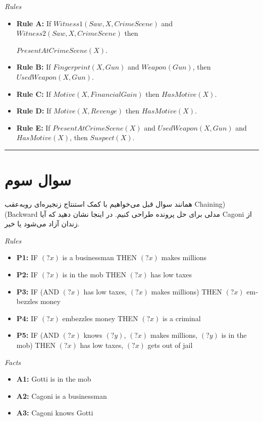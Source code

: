 \documentclass[a4paper,10pt]{article}
\begin{document}
\begin{latin}
	\emph{Rules}
\begin{itemize}
	\item \textbf{Rule A:} If $Witness1(Saw, X, CrimeScene)$ and $Witness2(Saw, X, CrimeScene)$ then
	 
	 $PresentAtCrimeScene(X)$.
	\item \textbf{Rule B:} If $Fingerprint(X, Gun)$ and $Weapon(Gun)$, then $UsedWeapon(X, Gun)$.
	\item \textbf{Rule C:} If $Motive(X, FinancialGain)$ then $HasMotive(X)$.
	\item \textbf{Rule D:} If $Motive(X, Revenge)$ then $HasMotive(X)$.
	\item \textbf{Rule E:} If $PresentAtCrimeScene(X)$ and $UsedWeapon(X, Gun)$ and $HasMotive(X)$, then $Suspect(X)$.
\end{itemize}
\end{latin}


\bigskip
\rule{\linewidth}{0.4pt}


\section{سوال سوم}

همانند سوال قبل می‌خواهیم با کمک استنتاج زنجیره‌ای روبه‌عقب 
 Chaining) (Backward
 مدلی برای حل پرونده طراحی کنیم. در اینجا نشان دهید که آیا Cagoni از زندان آزاد می‌شود یا خیر.

\begin{latin}
\emph{Rules}
\begin{itemize}
	\item \textbf{P1:} IF $(?x)$ is a businessman THEN $(?x)$ makes millions
	\item \textbf{P2:} IF $(?x)$ is in the mob THEN $(?x)$ has low taxes
	\item \textbf{P3:} IF (AND $(?x)$ has low taxes, $(?x)$ makes millions) THEN $(?x)$ embezzles money
	\item \textbf{P4:} IF $(?x)$ embezzles money THEN $(?x)$ is a criminal
	\item \textbf{P5:} IF (AND $(?x)$ knows $(?y)$, $(?x)$ makes millions, $(?y)$ is in the mob) THEN $(?x)$ has low taxes, $(?x)$ gets out of jail
\end{itemize}
\end{latin}

\begin{latin}
\emph{Facts}
\begin{itemize}
	\item \textbf{A1:} Gotti is in the mob
	\item \textbf{A2:} Cagoni is a businessman
	\item \textbf{A3:} Cagoni knows Gotti
\end{itemize}
\end{latin}
\end{document}
